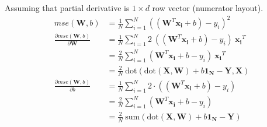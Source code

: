 \documentclass[12pt, fleqn]{article}
\begin{document}
\subsubsection{}
Assuming that partial derivative is $1 \times d$ row vector (numerator layout).
\begin{equation*}
  \begin{aligned}
    mse(\mathbf{W},b)                                      & = \frac{1}{N} \sum_{i=1}^N ((\mathbf{W}^T \mathbf{x_i} + b) - y_i)^2                                     \\
    \frac{\partial mse(\mathbf{W},b)}{\partial \mathbf{W}} & = \frac{1}{N} \sum_{i=1}^N 2 \ ((\mathbf{W}^T \mathbf{x_i} + b) - y_i) \ \mathbf{x_i}^T                  \\
                                                           & = \frac{2}{N} \sum_{i=1}^N (\mathbf{W}^T \mathbf{x_i} + b - y_i) \ \mathbf{x_i}^T                        \\
                                                           & = \frac{2}{N} \ \text{dot}(\text{dot}(\mathbf{X}, \mathbf{W}) + b \mathbf{1_N} - \mathbf{Y}, \mathbf{X}) \\
    \frac{\partial mse(\mathbf{W},b)}{\partial b}          & = \frac{1}{N} \sum_{i=1}^N 2 \cdot ((\mathbf{W}^T \mathbf{x_i} + b) - y_i)                               \\
                                                           & = \frac{2}{N} \sum_{i=1}^N (\mathbf{W}^T \mathbf{x_i} + b - y_i)                                         \\
                                                           & = \frac{2}{N} \ \text{sum}(\text{dot}(\mathbf{X}, \mathbf{W})  + b \mathbf{1_N} - \mathbf{Y})
  \end{aligned}
\end{equation*}
\end{document}
